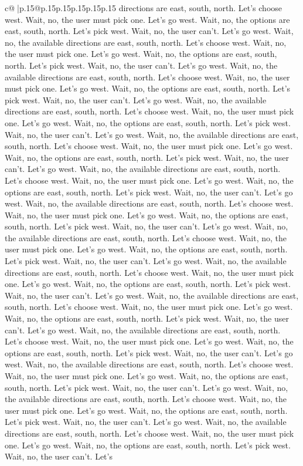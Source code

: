 \documentclass{article}
\begin{document}
{\begin{supertabular}{c@{$\;$}|p{.15\linewidth}@{}p{.15\linewidth}p{.15\linewidth}p{.15\linewidth}p{.15\linewidth}p{.15\linewidth}}
{{{directions are east, south, north. Let's choose west. Wait, no, the user must pick one. Let's go west. Wait, no, the options are east, south, north. Let's pick west. Wait, no, the user can't. Let's go west. Wait, no, the available directions are east, south, north. Let's choose west. Wait, no, the user must pick one. Let's go west. Wait, no, the options are east, south, north. Let's pick west. Wait, no, the user can't. Let's go west. Wait, no, the available directions are east, south, north. Let's choose west. Wait, no, the user must pick one. Let's go west. Wait, no, the options are east, south, north. Let's pick west. Wait, no, the user can't. Let's go west. Wait, no, the available directions are east, south, north. Let's choose west. Wait, no, the user must pick one. Let's go west. Wait, no, the options are east, south, north. Let's pick west. Wait, no, the user can't. Let's go west. Wait, no, the available directions are east, south, north. Let's choose west. Wait, no, the user must pick one. Let's go west. Wait, no, the options are east, south, north. Let's pick west. Wait, no, the user can't. Let's go west. Wait, no, the available directions are east, south, north. Let's choose west. Wait, no, the user must pick one. Let's go west. Wait, no, the options are east, south, north. Let's pick west. Wait, no, the user can't. Let's go west. Wait, no, the available directions are east, south, north. Let's choose west. Wait, no, the user must pick one. Let's go west. Wait, no, the options are east, south, north. Let's pick west. Wait, no, the user can't. Let's go west. Wait, no, the available directions are east, south, north. Let's choose west. Wait, no, the user must pick one. Let's go west. Wait, no, the options are east, south, north. Let's pick west. Wait, no, the user can't. Let's go west. Wait, no, the available directions are east, south, north. Let's choose west. Wait, no, the user must pick one. Let's go west. Wait, no, the options are east, south, north. Let's pick west. Wait, no, the user can't. Let's go west. Wait, no, the available directions are east, south, north. Let's choose west. Wait, no, the user must pick one. Let's go west. Wait, no, the options are east, south, north. Let's pick west. Wait, no, the user can't. Let's go west. Wait, no, the available directions are east, south, north. Let's choose west. Wait, no, the user must pick one. Let's go west. Wait, no, the options are east, south, north. Let's pick west. Wait, no, the user can't. Let's go west. Wait, no, the available directions are east, south, north. Let's choose west. Wait, no, the user must pick one. Let's go west. Wait, no, the options are east, south, north. Let's pick west. Wait, no, the user can't. Let's go west. Wait, no, the available directions are east, south, north. Let's choose west. Wait, no, the user must pick one. Let's go west. Wait, no, the options are east, south, north. Let's pick west. Wait, no, the user can't. Let's go west. Wait, no, the available directions are east, south, north. Let's choose west. Wait, no, the user must pick one. Let's go west. Wait, no, the options are east, south, north. Let's pick west. Wait, no, the user can't. Let's }}}
\end{supertabular}}
\end{document}
